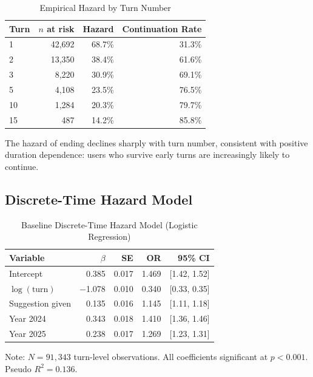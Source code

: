 \documentclass[11pt]{article}
\begin{document}
\begin{table}[h]
\centering
\caption{Empirical Hazard by Turn Number}
\label{tab:hazard}
\begin{tabular}{lrrr}
\toprule
Turn & $n$ at risk & Hazard & Continuation Rate \\
\midrule
1 & 42,692 & 68.7\% & 31.3\% \\
2 & 13,350 & 38.4\% & 61.6\% \\
3 & 8,220 & 30.9\% & 69.1\% \\
5 & 4,108 & 23.5\% & 76.5\% \\
10 & 1,284 & 20.3\% & 79.7\% \\
15 & 487 & 14.2\% & 85.8\% \\
\bottomrule
\end{tabular}
\end{table}

The hazard of ending declines sharply with turn number, consistent with positive duration dependence: users who survive early turns are increasingly likely to continue.

\subsection{Discrete-Time Hazard Model}

\begin{table}[h]
\centering
\caption{Baseline Discrete-Time Hazard Model (Logistic Regression)}
\label{tab:baseline}
\begin{tabular}{lrrrr}
\toprule
Variable & $\beta$ & SE & OR & 95\% CI \\
\midrule
Intercept & 0.385 & 0.017 & 1.469 & [1.42, 1.52] \\
$\log(\text{turn})$ & $-$1.078 & 0.010 & 0.340 & [0.33, 0.35] \\
Suggestion given & 0.135 & 0.016 & 1.145 & [1.11, 1.18] \\
Year 2024 & 0.343 & 0.018 & 1.410 & [1.36, 1.46] \\
Year 2025 & 0.238 & 0.017 & 1.269 & [1.23, 1.31] \\
\bottomrule
\end{tabular}
\begin{flushleft}
\small{Note: $N = 91,343$ turn-level observations. All coefficients significant at $p < 0.001$. Pseudo $R^2 = 0.136$.}
\end{flushleft}
\end{table}
\end{document}

